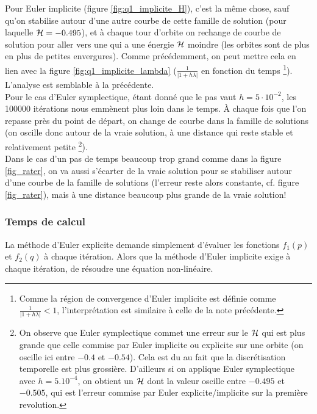 Pour Euler implicite (figure \ref{fig:q1_implicite_H}),
c'est la même chose, sauf qu'on stabilise autour d'une autre courbe de cette famille de solution (pour laquelle $\mathcal{H} = -0.495$), et à chaque tour d'orbite on rechange de courbe de solution pour aller vers une qui a une énergie $\mathcal{H}$ moindre (les orbites sont de plus en plus de petites envergures). Comme précédemment, on peut mettre cela en lien avec la figure \ref{fig:q1_implicite_lambda} ($\frac{1}{|1+h\lambda|}$ en fonction du temps \footnote{Comme la région de convergence d'Euler implicite est définie comme $\frac{1}{|1+h\lambda|}<1$, l'interprétation est similaire à celle de la note précédente.}). L'analyse est semblable à la précédente.\\

Pour le cas d'Euler symplectique, étant donné que le pas vaut $h=5 \cdot 10^{-2}$, les 100000 itérations nous emmènent plus loin dans le temps.
À chaque fois que l'on repasse près du point de départ,
on change de courbe dans la famille de solutions (on oscille donc autour de la vraie solution,
à une distance qui reste stable et relativement petite
\footnote{On observe que Euler symplectique commet une erreur sur le $\mathcal{H}$ qui est plus grande que celle commise par Euler implicite ou explicite sur une orbite (on oscille ici entre $-0.4$ et $-0.54$).
Cela est du au fait que la discrétisation temporelle est plus grossière.
D'ailleurs si on applique Euler symplectique avec $h=5.10^{-4}$, on obtient un $\mathcal{H}$ dont la valeur oscille entre $-0.495$ et $-0.505$, qui est l'erreur commise par Euler explicite/implicite sur la première revolution.}).\\
Dans le cas d'un pas de temps beaucoup trop grand comme dans la figure \ref{fig_rater},
on va aussi s'écarter de la vraie solution pour se stabiliser autour d'une courbe de la famille de solutions
(l'erreur reste alors constante, cf. figure \ref{fig_rater}), mais à une distance beaucoup plus grande de la vraie solution!



\subsubsection{Temps de calcul}
La méthode d'Euler explicite demande simplement d'évaluer les fonctions $f_1(p)$ et $f_2(q)$ à chaque itération.
Alors que la méthode d'Euler implicite exige à chaque itération,
de résoudre une équation non-linéaire.

